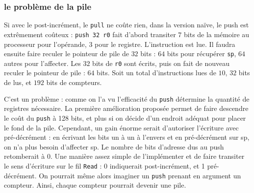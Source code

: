 \documentclass[architecture]{compas2018}
\begin{document}
\subsubsection{le problème de la pile}
Si avec le post-incrément, le \texttt{pull} ne coûte rien, dans la version naïve, le push est extrêmement coûteux : \texttt{push 32 r0} fait d'abord transiter $7$ bits de la mémoire au processeur pour l'opérande, $3$ pour le registre. L'instruction est lue. Il faudra ensuite faire reculer le pointeur de pile de $32$ bits : $64$ bits pour récupérer \texttt{sp}, $64$ autres pour l'affecter. Les $32$ bits de \texttt{r0} sont écrits, puis on fait de nouveau reculer le pointeur de pile : $64$ bits. Soit un total d'instructions lues de $10$, $32$ bits de lus, et $192$ bits de compteurs.\par
C'est un problème : comme on l'a vu l'efficacité du \texttt{push} détermine la quantité de registres nécessaire. La première amélioration proposée permet de faire descendre le coût du \texttt{push} à 128 bits, et plus si on décide d'un endroit adéquat pour placer le fond de la pile. Cependant, un gain énorme serait d'autoriser l'écriture avec pré-décrément : en écrivant les bits un à un à l'envers et en pré-décrément sur sp, on n'a plus besoin d'affecter sp. Le nombre de bits d'adresse dus au push retomberait à 0. Une manière assez simple de l'implémenter et de faire transiter le sens d'écriture sur le fil \texttt{Read} : 0 indiquerait post-incrément, et 1 pré-décrément. On pourrait même alors imaginer un \texttt{push} prenant en argument un compteur. Ainsi, chaque compteur pourrait devenir une pile.
\end{document}

